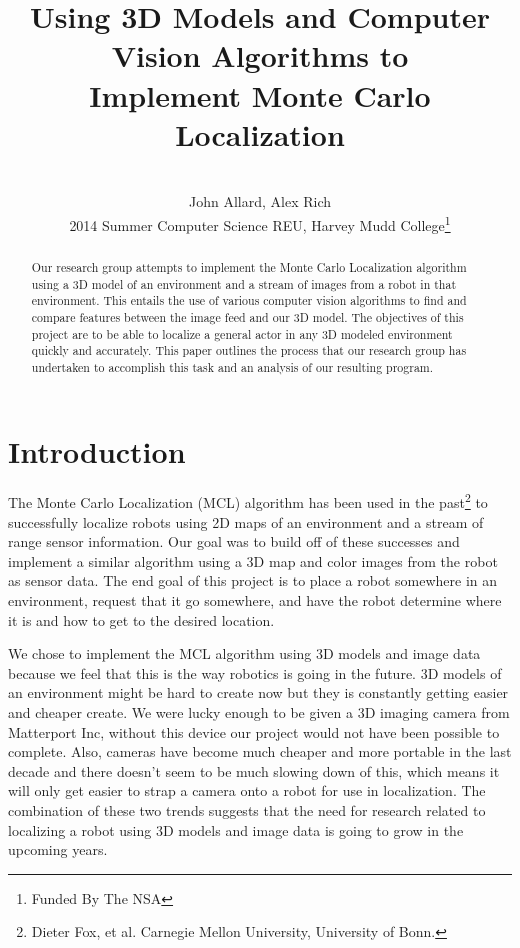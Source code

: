 \documentclass[a4paper,11pt]{article}
\title{Using 3D Models and Computer Vision Algorithms to \\ Implement Monte Carlo Localization}
\author{ \\[7in]  John Allard, Alex Rich \\ 2014 Summer Computer Science REU, Harvey Mudd College\thanks{Funded By The NSA}}
\begin{document}
  \maketitle   
  \newpage  
  
  \tableofcontents
  \newpage

  \begin{abstract}  
  Our research group attempts to implement the Monte Carlo Localization algorithm using a 3D model of an environment and a stream of images from a robot in that environment. This entails the use of various computer vision algorithms to find and compare features between the image feed and our 3D model. The objectives of this project are to be able to localize a general actor in any 3D modeled environment quickly and accurately. This paper outlines the process that our research group has undertaken to accomplish this task and an analysis of our resulting program. 
  \end{abstract}
  
  \section{Introduction} 
 The Monte Carlo Localization (MCL) algorithm has been used in the past\footnote{ Dieter Fox, et al. Carnegie Mellon University, University of Bonn.} to successfully localize robots using 2D maps of an environment and a stream of range sensor information. Our goal was to build off of these successes and implement a similar algorithm using a 3D map and color images from the robot as sensor data. The end goal of this project is to place a robot somewhere in an environment, request that it go somewhere, and have the robot determine where it is and how to get to the desired location.

We chose to implement the MCL algorithm using 3D models and image data because we feel that this is the way robotics is going in the future. 3D models of an environment might be hard to create now but they is constantly getting easier and cheaper create. We were lucky enough to be given a 3D imaging camera from Matterport Inc, without this device our project would not have been possible to complete. Also, cameras have become much cheaper and more portable in the last decade and there doesn't seem to be much slowing down of this, which means it will only get easier to strap a camera onto a robot for use in localization. The combination of these two trends suggests that the need for research related to localizing a robot using 3D models and image data is going to grow in the upcoming years.
\end{document}
